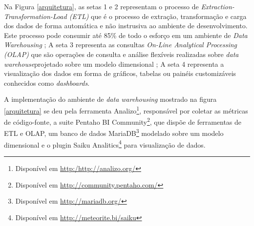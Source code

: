 Na Figura \ref{arquitetura}, as setas 1 e 2 representam o processo de \textit{Extraction-Transformation-Load (ETL)} que é o processo de extração, transformação e carga dos dados de forma automática e não instrusiva ao ambiente de desenvolvimento. Este processo pode consumir até 85\% de todo o esforço em um ambiente de \textit{Data Warehousing} \cite{Kimball2002}; A seta 3 representa as consultas \textit{On-Line Analytical Processing (OLAP)} que são operações de consulta e análise flexíveis realizadas sobre \textit{data warehouse}projetado sobre um modelo dimensional \cite{Kimball2002} \cite{Codd1993}; A seta 4 representa a visualização dos dados em forma de gráficos, tabelas ou painéis customizáveis conhecidos como \textit{dashboards}.


A implementação do ambiente de \textit{data warehousing} mostrado na figura \ref{arquitetura} se deu pela ferramenta Analizo\footnote{Disponível em \url{http:/http://analizo.org/}}, responsável por coletar as métricas de código-fonte, a suite Pentaho BI Community\footnote{Disponível em \url{http://community.pentaho.com/}}, que dispõe de ferramentas de ETL e OLAP, um banco de dados MariaDB\footnote{Disponível em \url{http://mariadb.org/}} modelado sobre um modelo dimensional e o plugin Saiku Analitics\footnote{Disponível em \url{http://meteorite.bi/saiku}} para visualização de dados. 
